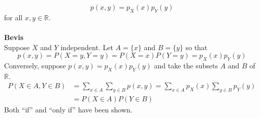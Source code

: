 \documentclass[12pt,a4paper,draft]{report}
\begin{document}
\begin{equation}
p(x,y)=p_X(x)p_Y(y)
\end{equation}
for all $x,y\in\mathbb{R}$.\\\\
\textbf{Bevis}\\
Suppose $X$ and $Y$ independent. Let $A=\{x\}$ and $B=\{y\}$ so that
\begin{equation}
p(x,y)=P(X=y,Y=y)=P(X=x)P(Y=y)=p_X(x)p_Y(y)
\end{equation}
Conversely, suppose $p(x,y)=p_X(x)p_Y(y)$ and take  the subsets $A$ and $B$ of $\mathbb{R}$.
\begin{align*}
P(X\in A,Y\in B)&=\sum_{x\in A}\sum_{y\in B}p(x,y)=\sum_{x\in A}p_X(x)\sum_{y\in B}p_Y(y)\\
&=P(X\in A)P(Y\in B)
\end{align*}
Both ``if'' and ``only if'' have been shown.
\end{document}
